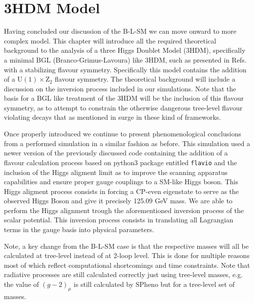 %

\newpage 

\chapter{3HDM Model}
\label{ch:3HDM}

Having concluded our discussion of the B-L-SM we can move onward to more complex model.
%
This chapter will introduce all the required theoretical background to the analysis of a three Higgs Doublet Model (3HDM), specifically a minimal BGL (Branco-Grimus-Lavoura) like 3HDM, such as presented in Refs.~\cite{Ludvig_Thesis,Ian_Thesis} with a stabilizing flavour symmetry. 
% 
Specifically this model contains the addition of a $\mathrm{U}(1) \times \mathrm{Z}_2$ flavour symmetry.
% 
The theoretical background will include a discussion on the inversion process included in our simulations. 
%
Note that the basis for a BGL like treatment of the 3HDM will be the inclusion of this flavour symmetry, as to attempt to constrain the otherwise dangerous tree-level flavour violating decays that as mentioned in  surge in these kind of frameworks. 

Once properly introduced we continue to present phenomenological conclusions from a performed simulation in a similar fashion as before. 
%
This simulation used a newer version of the previously discussed code containing the addition of a flavour calculation process based on python3 package entitled \texttt{flavio} \cite{straub2018flavio} and the inclusion of the Higgs aligment limit as to improve the scanning apparatus capabilities and ensure proper gauge couplings to a SM-like Higgs boson.
%
This Higgs aligment process consists in forcing a CP-even eigenstate to serve as the observed Higgs Boson and give it precisely 125.09 GeV mass.   
%
We are able to perform the Higgs alignment trough the aforementioned inversion process of the scalar potential. 
%
This inversion process consists in translating all Lagrangian terms in the gauge basis into physical parameters. 


Note, a key change from the B-L-SM case is that the respective masses will all be calculated at tree-level instead of at 2-loop level. 
%
This is done for multiple reasons most of which reflect computational shortcomings and time constraints.
%
Note that radiative processes are still calculated correctly just using tree-level masses, e.g. the value of $(g-2)_\mu$ is still calculated by SPheno but for a tree-level set of masses.

